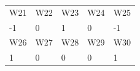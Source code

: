 \documentclass[11pt]{article}
\begin{document}
\begin{table}[h]
\begin{tabular}{lllll}
  \rowcolor[HTML]{000000}
  {\color[HTML]{FFFFFF} W21}                        & {\color[HTML]{FFFFFF} W22} & {\color[HTML]{FFFFFF} W23} & {\color[HTML]{FFFFFF} W24} & {\color[HTML]{FFFFFF} W25} \\
  -1                                                & 0                          & 1                          & 0                          & -1                         \\
  \rowcolor[HTML]{000000}
  {\color[HTML]{FFFFFF} W26}                        & {\color[HTML]{FFFFFF} W27} & {\color[HTML]{FFFFFF} W28} & {\color[HTML]{FFFFFF} W29} & {\color[HTML]{FFFFFF} W30} \\
  1                                                 & 0                          & 0                          & 0                          & 1
  \end{tabular}
\end{table}
\end{document}
